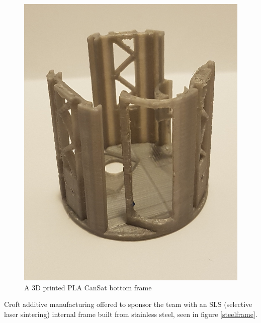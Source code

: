 \documentclass[]{report}
\begin{document}
		\begin{figure}[h]
			\hfill\includegraphics[scale=0.15]{pla_frame.jpg}\hspace*{\fill}
			\caption{A 3D printed PLA CanSat bottom frame}
			\label{plaframe}
		\end{figure}
		
		
		Croft additive manufacturing offered to sponsor the team with an SLS (selective laser sintering) internal frame built from stainless steel, seen in figure \ref{steelframe}.
		
\end{document}
